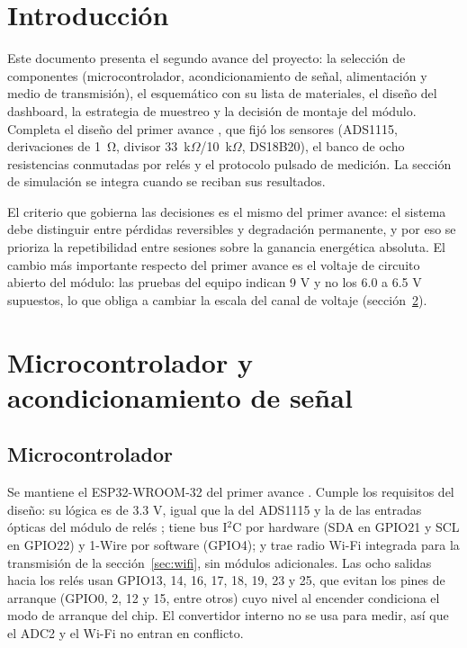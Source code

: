 \documentclass[10pt,letterpaper,twocolumn]{article}
\begin{document}
\medskip{}

\section{Introducción}
Este documento presenta el segundo avance del proyecto: la selección de componentes (microcontrolador, acondicionamiento de señal, alimentación y medio de transmisión), el esquemático con su lista de materiales, el diseño del dashboard, la estrategia de muestreo y la decisión de montaje del módulo. Completa el diseño del primer avance \cite{avance1}, que fijó los sensores (ADS1115, derivaciones de \SI{1}{\ohm}, divisor 33~k$\Omega$/10~k$\Omega$, DS18B20), el banco de ocho resistencias conmutadas por relés y el protocolo pulsado de medición. La sección de simulación se integra cuando se reciban sus resultados.

El criterio que gobierna las decisiones es el mismo del primer avance: el sistema debe distinguir entre pérdidas reversibles y degradación permanente, y por eso se prioriza la repetibilidad entre sesiones sobre la ganancia energética absoluta. El cambio más importante respecto del primer avance es el voltaje de circuito abierto del módulo: las pruebas del equipo indican 9 V y no los 6.0 a 6.5 V supuestos, lo que obliga a cambiar la escala del canal de voltaje (sección~\ref{sec:acond}).

\section{Microcontrolador y acondicionamiento de señal}\label{sec:acond}
\subsection{Microcontrolador}
Se mantiene el ESP32-WROOM-32 del primer avance \cite{avance1}. Cumple los requisitos del diseño: su lógica es de 3.3 V, igual que la del ADS1115 y la de las entradas ópticas del módulo de relés \cite{relmod}; tiene bus I$^2$C por hardware (SDA en GPIO21 y SCL en GPIO22) y 1-Wire por software (GPIO4); y trae radio Wi-Fi integrada para la transmisión de la sección~\ref{sec:wifi}, sin módulos adicionales. Las ocho salidas hacia los relés usan GPIO13, 14, 16, 17, 18, 19, 23 y 25, que evitan los pines de arranque (GPIO0, 2, 12 y 15, entre otros) cuyo nivel al encender condiciona el modo de arranque del chip. El convertidor interno no se usa para medir, así que el ADC2 y el Wi-Fi no entran en conflicto.
\end{document}
